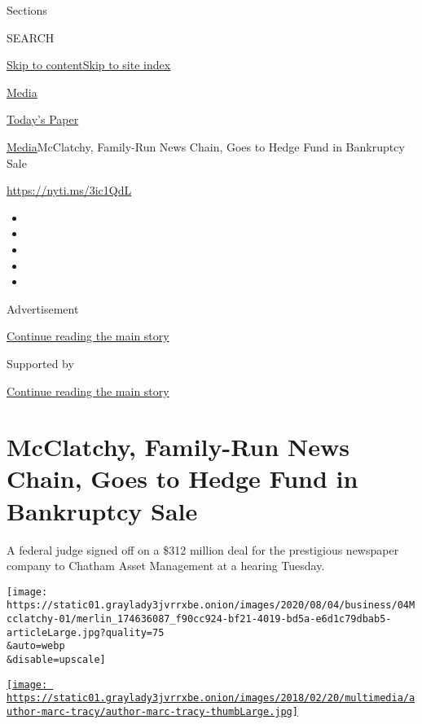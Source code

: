 Sections

SEARCH

\protect\hyperlink{site-content}{Skip to
content}\protect\hyperlink{site-index}{Skip to site index}

\href{https://www.nytimes3xbfgragh.onion/section/business/media}{Media}

\href{https://myaccount.nytimes3xbfgragh.onion/auth/login?response_type=cookie\&client_id=vi}{}

\href{https://www.nytimes3xbfgragh.onion/section/todayspaper}{Today's
Paper}

\href{/section/business/media}{Media}\textbar{}McClatchy, Family-Run
News Chain, Goes to Hedge Fund in Bankruptcy Sale

\href{https://nyti.ms/3ic1QdL}{https://nyti.ms/3ic1QdL}

\begin{itemize}
\item
\item
\item
\item
\item
\end{itemize}

Advertisement

\protect\hyperlink{after-top}{Continue reading the main story}

Supported by

\protect\hyperlink{after-sponsor}{Continue reading the main story}

\hypertarget{mcclatchy-family-run-news-chain-goes-to-hedge-fund-in-bankruptcy-sale}{%
\section{McClatchy, Family-Run News Chain, Goes to Hedge Fund in
Bankruptcy
Sale}\label{mcclatchy-family-run-news-chain-goes-to-hedge-fund-in-bankruptcy-sale}}

A federal judge signed off on a \$312 million deal for the prestigious
newspaper company to Chatham Asset Management at a hearing Tuesday.

\texttt{[image: https://static01.graylady3jvrrxbe.onion/images/2020/08/04/business/04Mcclatchy-01/merlin\_174636087\_f90cc924-bf21-4019-bd5a-e6d1c79dbab5-articleLarge.jpg?quality=75\\\&auto=webp\\\&disable=upscale]}

\href{https://www.nytimes3xbfgragh.onion/by/marc-tracy}{\texttt{[image: https://static01.graylady3jvrrxbe.onion/images/2018/02/20/multimedia/author-marc-tracy/author-marc-tracy-thumbLarge.jpg]}}

